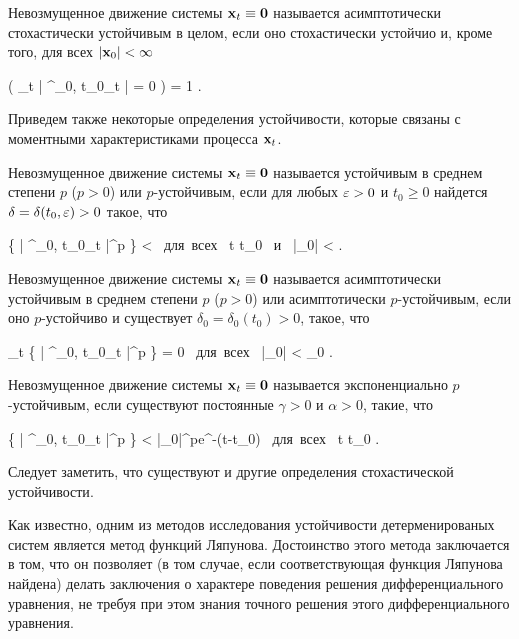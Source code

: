 \begin{df}
	Невозмущенное движение системы $\mathbf{x}_t \equiv \mathbf{0}$ называется асимптотически стохастически устойчивым в целом, если оно стохастически устойчио и, кроме того, для всех $|\mathbf{x}_0| < \infty$
	
	\beqn
		\prob \biggl( \lim\limits_{t \to \infty} \bigl| \m{x}^{_0, t_0}_t \bigr| = 0 \biggr) = 1 \mbox{.}
	\eeqn
\end{df}

Приведем также некоторые определения устойчивости, которые связаны с моментными характеристиками процесса $\mathbf{x}_t$.

\begin{df}
	Невозмущенное движение системы $\mathbf{x}_t \equiv \mathbf{0}$ называется устойчивым в среднем степени $p$ ($p > 0$) или $p$-устойчивым, если для любых $\varepsilon > 0$ и $t_0 \geqslant 0$ найдется $\delta = \delta(t_0, \varepsilon) > 0$ такое, что
	
	\beqn
		\E \Bigl\{ \bigl| \m{x}^{_0, t_0}_t \bigr|^p \Bigr\} < \eps \mbox{ для всех } t \geqslant t_0 \mbox{ и } |_0| < \delta \mbox{.}
	\eeqn
\end{df}

\begin{df}
	Невозмущенное движение системы $\mathbf{x}_t \equiv \mathbf{0}$ называется асимптотически устойчивым в среднем степени $p$ ($p > 0$) или асимптотически $p$-устойчивым, если оно $p$-устойчиво и существует $\delta_0 = \delta_0(t_0) > 0$, такое, что
	
	\beqn
		\lim\limits_{t \to \infty} \E \Bigl\{ \bigl| \m{x}^{_0, t_0}_t \bigr|^p \Bigr\} = 0 \mbox{ для всех } |_0| < \delta_0 \mbox{.}
	\eeqn
\end{df}

\begin{df}
	Невозмущенное движение системы $\mathbf{x}_t \equiv \mathbf{0}$ называется экспоненциально $p$-устойчивым, если существуют постоянные $\gamma > 0$ и $\alpha > 0$, такие, что
	
	\beqn
		\E \Bigl\{ \bigl| \m{x}^{_0, t_0}_t \bigr|^p \Bigr\} < \gamma|_0|^pe^{-\alpha(t-t_0)} \mbox{ для всех } t \geqslant t_0 \mbox{.}
	\eeqn
\end{df}

Следует заметить, что существуют и другие определения стохастической устойчивости\cite{KUSHNER}.

\br

Как известно, одним из методов исследования устойчивости детерменированых систем является метод функций Ляпунова. Достоинство этого метода заключается в том, что он позволяет (в том случае, если соответствующая функция Ляпунова найдена) делать заключения о характере поведения решения дифференциального уравнения, не требуя при этом знания точного решения этого дифференциального уравнения.

